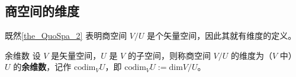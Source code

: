 
\subsection{商空间的维度}
既然\autoref{the_QuoSpa_2} 表明商空间 $V/U$ 是个矢量空间，因此其就有维度的定义。
\begin{definition}{余维数}
设 $V$ 是矢量空间，$U$ 是 $V$ 的子空间，则称商空间 $V/U$ 的维度为（$V$ 中） $U$ 的\textbf{余维数}，记作 $\mathrm{codim}_V U$，即 $\mathrm{codim}_V U:=\mathrm{dim} V/U$。
\end{definition}




% 


